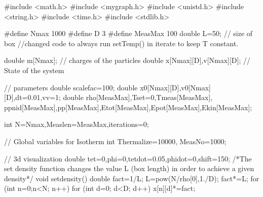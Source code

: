 #include <math.h>
#include <mygraph.h>
#include <unistd.h>
#include <string.h>
#include <time.h>
#include <stdlib.h>

#define Nmax 1000
#define D 3
#define MeasMax 100
double  L=50; // size of box
//changed code to always run setTemp() in iterate to keep T constant.

double m[Nmax]; // charges of the particles
double x[Nmax][D],v[Nmax][D]; // State of the system

// parameters
double scalefac=100;
double x0[Nmax][D],v0[Nmax][D],dt=0.01,vv=1;
double rho[MeasMax],Tset=0,Tmeas[MeasMax], ppnid[MeasMax],pp[MeasMax],Etot[MeasMax],Epot[MeasMax],Ekin[MeasMax];

int N=Nmax,Measlen=MeasMax,iterations=0;

// Global variables for Isotherm
int Thermalize=10000, MeasNo=1000;

// 3d visualization
double tet=0,phi=0,tetdot=0.05,phidot=0,shift=150;
/*The set density function changes the value L (box length) in order to achieve a given density*/
void setdensity(){
  double fact=1/L;
  L=pow(N/rho[0],1./D);
  fact*=L;
  for (int n=0;n<N; n++)
    for (int d=0; d<D; d++)
      x[n][d]*=fact;
}

